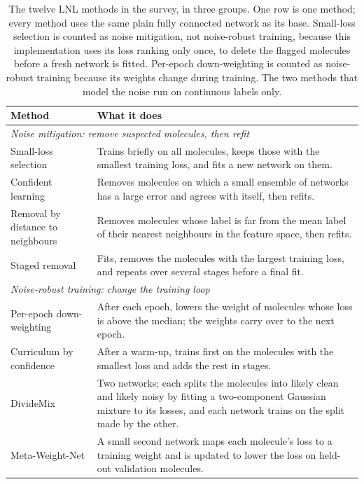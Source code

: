 \begin{table}[htbp]
\centering
\caption{The twelve LNL methods in the survey, in three groups. One row is one method; every method uses the same plain fully connected network as its base. Small-loss selection is counted as noise mitigation, not noise-robust training, because this implementation uses its loss ranking only once, to delete the flagged molecules before a fresh network is fitted. Per-epoch down-weighting is counted as noise-robust training because its weights change during training. The two methods that model the noise run on continuous labels only.}
\label{tab:lnl_methods}
\small
\begin{tabular}{p{}p{}}
\toprule
\textbf{Method} & \textbf{What it does} \\
\midrule
\multicolumn{2}{l}{\textit{Noise mitigation: remove suspected molecules, then refit}} \\
Small-loss selection \citep{Han2018} & Trains briefly on all molecules, keeps those with the smallest training loss, and fits a new network on them. \\
Confident learning \citep{Northcutt2021} & Removes molecules on which a small ensemble of networks has a large error and agrees with itself, then refits. \\
Removal by distance to neighbours & Removes molecules whose label is far from the mean label of their nearest neighbours in the feature space, then refits. \\
Staged removal \citep{zhao2025} & Fits, removes the molecules with the largest training loss, and repeats over several stages before a final fit. \\
\midrule
\multicolumn{2}{l}{\textit{Noise-robust training: change the training loop}} \\
Per-epoch down-weighting & After each epoch, lowers the weight of molecules whose loss is above the median; the weights carry over to the next epoch. \\
Curriculum by confidence \citep{Bengio2009} & After a warm-up, trains first on the molecules with the smallest loss and adds the rest in stages. \\
DivideMix \citep{li2020dividemix} & Two networks; each splits the molecules into likely clean and likely noisy by fitting a two-component Gaussian mixture to its losses, and each network trains on the split made by the other. \\
Meta-Weight-Net \citep{shu2019metaweightnet} & A small second network maps each molecule's loss to a training weight and is updated to lower the loss on held-out validation molecules. \\

\end{tabular}
\end{table}
